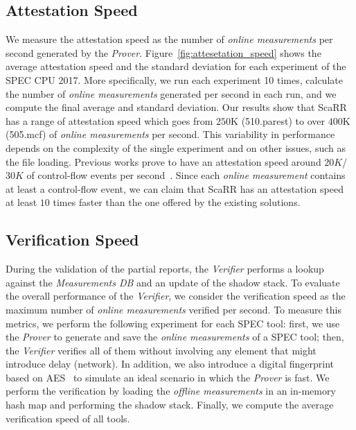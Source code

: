 \subsection{Attestation Speed}
\label{ssec:attestation-speed}
We measure the attestation speed as the number of \emph{online measurements} 
per second generated by the \emph{Prover}. 
Figure~\ref{fig:attesetation_speed} shows the average attestation speed and the 
standard deviation for each experiment of the SPEC CPU 2017. 
More specifically, we run each experiment 10 times, calculate the number of 
\emph{online measurements} generated per second in each run, and we compute the 
final average and standard deviation. 
Our results show that ScaRR has a range of attestation speed which goes from 
$250$K (510.parest) to over $400$K (505.mcf) of \emph{online measurements} per 
second. This variability in performance depends on the complexity of the single 
experiment and on other issues, such as the file loading. Previous works prove 
to have an attestation speed around $20K$/ $30K$ of control-flow events per 
second~\cite{aberadiat,abera2016c}. Since each \emph{online measurement} 
contains at least a control-flow event, we can claim that ScaRR has an 
attestation speed at least $10$ times faster than the one offered by the 
existing solutions.


\subsection{Verification Speed}
\label{ssec:verification-speed}
During the validation of the partial reports, the \emph{Verifier} performs a 
lookup against the \emph{Measurements DB} and an update of the shadow stack. 
To evaluate the overall performance of the \emph{Verifier}, we consider the 
verification speed as the maximum number of \emph{online measurements} verified 
per second. 
To measure this metrics, we perform the following experiment for each SPEC tool:
first, we use the \emph{Prover} to generate and save the \emph{online 
measurements} of a SPEC tool; 
then, the \emph{Verifier} verifies all of them without involving any element 
that might introduce delay (\eg network). 
In addition, we also introduce a digital fingerprint based on 
AES~\cite{Stallings:2002:AES:763194.763196} to simulate an ideal scenario in 
which the \emph{Prover} is fast. 
We perform the verification by loading the \emph{offline measurements} in an 
in-memory hash map and performing the shadow stack.
Finally, we compute the average verification speed of all tools.

